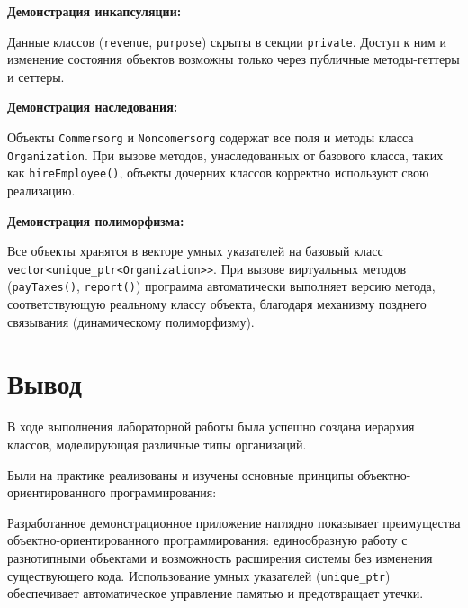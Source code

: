 \documentclass[oneside,a4paper,14pt]{extarticle}
\begin{document}
\textbf{Демонстрация инкапсуляции:}

Данные классов (\texttt{revenue}, \texttt{purpose}) скрыты в секции \texttt{private}. Доступ к ним и изменение состояния объектов возможны только через публичные методы-геттеры и сеттеры.

\textbf{Демонстрация наследования:}

Объекты \texttt{Commersorg} и \texttt{Noncomersorg} содержат все поля и методы класса \texttt{Organization}. При вызове методов, унаследованных от базового класса, таких как \texttt{hireEmployee()}, объекты дочерних классов корректно используют свою реализацию.

\textbf{Демонстрация полиморфизма:}

Все объекты хранятся в векторе умных указателей на базовый класс \texttt{vector<unique\_ptr<Organization>>}. При вызове виртуальных методов (\texttt{payTaxes()}, \texttt{report()}) программа автоматически выполняет версию метода, соответствующую реальному классу объекта, благодаря механизму позднего связывания (динамическому полиморфизму).

\newpage

\section*{Вывод}
В ходе выполнения лабораторной работы была успешно создана иерархия классов, моделирующая различные типы организаций.

Были на практике реализованы и изучены основные принципы объектно-ориентированного программирования:

Разработанное демонстрационное приложение наглядно показывает преимущества объектно-ориентированного программирования: единообразную работу с разнотипными объектами и возможность расширения системы без изменения существующего кода. Использование умных указателей (\texttt{unique\_ptr}) обеспечивает автоматическое управление памятью и предотвращает утечки.
\end{document}

